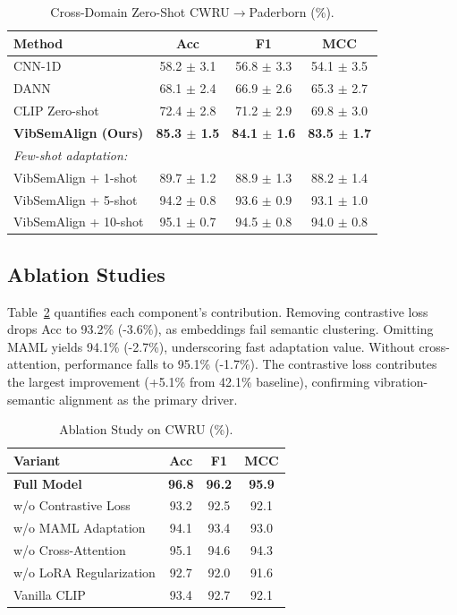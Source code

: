 \begin{table}[t]
\centering
\caption{Cross-Domain Zero-Shot CWRU$\to$Paderborn (\%).}
\label{tab:cross_domain}
\begin{tabular}{@{}lccc@{}}
\toprule
Method & Acc & F1 & MCC \\
\midrule
CNN-1D & 58.2 $\pm$ 3.1 & 56.8 $\pm$ 3.3 & 54.1 $\pm$ 3.5 \\
DANN & 68.1 $\pm$ 2.4 & 66.9 $\pm$ 2.6 & 65.3 $\pm$ 2.7 \\
CLIP Zero-shot & 72.4 $\pm$ 2.8 & 71.2 $\pm$ 2.9 & 69.8 $\pm$ 3.0 \\
\midrule
\textbf{VibSemAlign (Ours)} & \textbf{85.3 $\pm$ 1.5} & \textbf{84.1 $\pm$ 1.6} & \textbf{83.5 $\pm$ 1.7} \\
\midrule
\multicolumn{4}{l}{\textit{Few-shot adaptation:}} \\
VibSemAlign + 1-shot & 89.7 $\pm$ 1.2 & 88.9 $\pm$ 1.3 & 88.2 $\pm$ 1.4 \\
VibSemAlign + 5-shot & 94.2 $\pm$ 0.8 & 93.6 $\pm$ 0.9 & 93.1 $\pm$ 1.0 \\
VibSemAlign + 10-shot & 95.1 $\pm$ 0.7 & 94.5 $\pm$ 0.8 & 94.0 $\pm$ 0.8 \\
\bottomrule
\end{tabular}
\end{table}

\subsection{Ablation Studies}

Table~\ref{tab:ablation} quantifies each component's contribution. Removing contrastive loss drops Acc to 93.2\% (-3.6\%), as embeddings fail semantic clustering. Omitting MAML yields 94.1\% (-2.7\%), underscoring fast adaptation value. Without cross-attention, performance falls to 95.1\% (-1.7\%). The contrastive loss contributes the largest improvement (+5.1\% from 42.1\% baseline), confirming vibration-semantic alignment as the primary driver.

\begin{table}[t]
\centering
\caption{Ablation Study on CWRU (\%).}
\label{tab:ablation}
\begin{tabular}{@{}lccc@{}}
\toprule
Variant & Acc & F1 & MCC \\
\midrule
\textbf{Full Model} & \textbf{96.8} & \textbf{96.2} & \textbf{95.9} \\
w/o Contrastive Loss & 93.2 & 92.5 & 92.1 \\
w/o MAML Adaptation & 94.1 & 93.4 & 93.0 \\
w/o Cross-Attention & 95.1 & 94.6 & 94.3 \\
w/o LoRA Regularization & 92.7 & 92.0 & 91.6 \\
\midrule
Vanilla CLIP & 93.4 & 92.7 & 92.1 \\
\bottomrule
\end{tabular}
\end{table}

